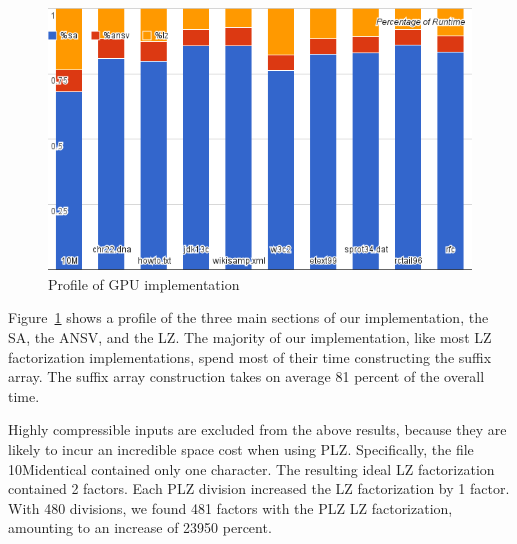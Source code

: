 \begin{figure}[ht!]
\centering
\includegraphics[width=1.0\textwidth]{images/allprof.png}
\caption{Profile of GPU implementation}
\label{fig:allprof}
\end{figure}

Figure~\ref{fig:allprof} shows a profile of the three main sections of our implementation, the SA, the ANSV, and the LZ.
The majority of our implementation, like most LZ factorization implementations, spend most of their time constructing the suffix array.
The suffix array construction takes on average 81 percent of the overall time.

Highly compressible inputs are excluded from the above results, because they are likely to incur an incredible space cost when using PLZ.
Specifically, the file 10Midentical contained only one character.
The resulting ideal LZ factorization contained 2 factors.
Each PLZ division increased the LZ factorization by 1 factor.
With 480 divisions, we found 481 factors with the PLZ LZ factorization, amounting to an increase of 23950 percent.
